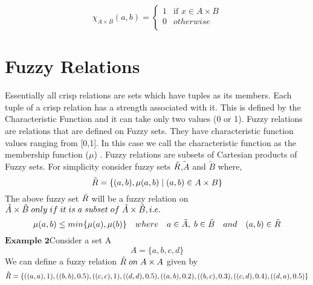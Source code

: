 \documentclass{article}
\begin{document}
\begin{equation}
\chi_{A \times B}(a,b)=
    \begin{cases}
        1 & \text{if } x \in A\times B\\
        0 & otherwise\\
    \end{cases}
\end{equation}



\section{Fuzzy Relations}

Essentially all crisp relations are sets which have tuples as its members. Each tuple of a crisp relation has a strength associated with it. This is defined by the Characteristic Function and it can take only two values (0 or 1). Fuzzy relations are relations that are defined on Fuzzy sets. They have characteristic function values ranging from [0,1]. In this case we call the characteristic function as the membership function ($\mu$) . Fuzzy relations are subsets of Cartesian products of Fuzzy sets.\newline
For simplicity consider  fuzzy sets $\Tilde{R}$,$\tilde{A}$ and $\tilde{B}$ where,
\begin{equation}
\Tilde{R}=\{(a,b),\mu(a,b)\mid (a,b)\in A\times B\}
\end{equation}
The above fuzzy set $\Tilde{R}$ will be a fuzzy relation on $\Tilde{A} \times \Tilde{B} \hspace{0.1cm} only \hspace{0.1cm}if\hspace{0.1cm}  it\hspace{0.1cm}  is\hspace{0.1cm}  a \hspace{0.1cm} subset \hspace{0.1cm}  of\hspace{0.1cm}  \Tilde{A}\times\Tilde{B}, i.e.$ 
\[\mu(a,b) \leq min\{\mu(a),\mu(b)\}\quad where\quad a\in\Tilde{A} , \hspace{0.1cm} b\in \Tilde{B}\quad and\quad (a,b)\in\Tilde{R}\]
$\textbf{Example 2}$\newline Consider a set A
\[A=\{a,b,c,d\}\] We can define a fuzzy relation $\Tilde{R}\hspace{0.1cm}on \hspace{0.1cm} A\times A$ given by
\[\Tilde{R} = \{((a,a),1),((b,b),0.5),((c,c),1),((d,d),0.5),((a,b),0.2),((b,c),0.3),((c,d),0.4),((d,a),0.5)\} \]
\end{document}
